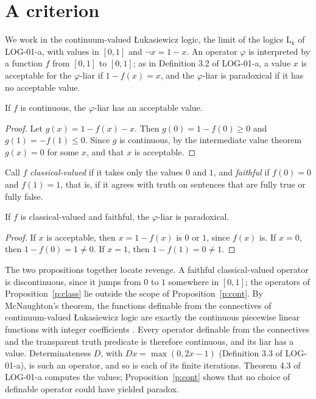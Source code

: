 \documentclass{situationist-preprint}
\begin{document}
\section{A criterion}

We work in the continuum-valued Łukasiewicz logic, the limit of the logics $\mathrm{L}_k$ of LOG-01-a, with values in $[0,1]$ and $\neg x = 1 - x$. An operator $\varphi$ is interpreted by a function $f$ from $[0,1]$ to $[0,1]$; as in Definition 3.2 of LOG-01-a, a value $x$ is acceptable for the $\varphi$-liar if $1 - f(x) = x$, and the $\varphi$-liar is paradoxical if it has no acceptable value.

\begin{proposition}\label{p:cont}
If $f$ is continuous, the $\varphi$-liar has an acceptable value.
\end{proposition}

\begin{proof}
Let $g(x) = 1 - f(x) - x$. Then $g(0) = 1 - f(0) \geq 0$ and $g(1) = -f(1) \leq 0$. Since $g$ is continuous, by the intermediate value theorem $g(x) = 0$ for some $x$, and that $x$ is acceptable.
\end{proof}

Call $f$ \emph{classical-valued} if it takes only the values $0$ and $1$, and \emph{faithful} if $f(0) = 0$ and $f(1) = 1$, that is, if it agrees with truth on sentences that are fully true or fully false.

\begin{proposition}\label{p:class}
If $f$ is classical-valued and faithful, the $\varphi$-liar is paradoxical.
\end{proposition}

\begin{proof}
If $x$ is acceptable, then $x = 1 - f(x)$ is $0$ or $1$, since $f(x)$ is. If $x = 0$, then $1 - f(0) = 1 \neq 0$. If $x = 1$, then $1 - f(1) = 0 \neq 1$.
\end{proof}

The two propositions together locate revenge. A faithful classical-valued operator is discontinuous, since it jumps from $0$ to $1$ somewhere in $[0,1]$; the operators of Proposition~\ref{p:class} lie outside the scope of Proposition~\ref{p:cont}. By McNaughton's theorem, the functions definable from the connectives of continuum-valued Łukasiewicz logic are exactly the continuous piecewise linear functions with integer coefficients \citep{McNaughton1951}. Every operator definable from the connectives and the transparent truth predicate is therefore continuous, and its liar has a value. Determinateness $D$, with $D x = \max(0, 2x - 1)$ (Definition 3.3 of LOG-01-a), is such an operator, and so is each of its finite iterations. Theorem 4.3 of LOG-01-a computes the values; Proposition~\ref{p:cont} shows that no choice of definable operator could have yielded paradox.
\end{document}
